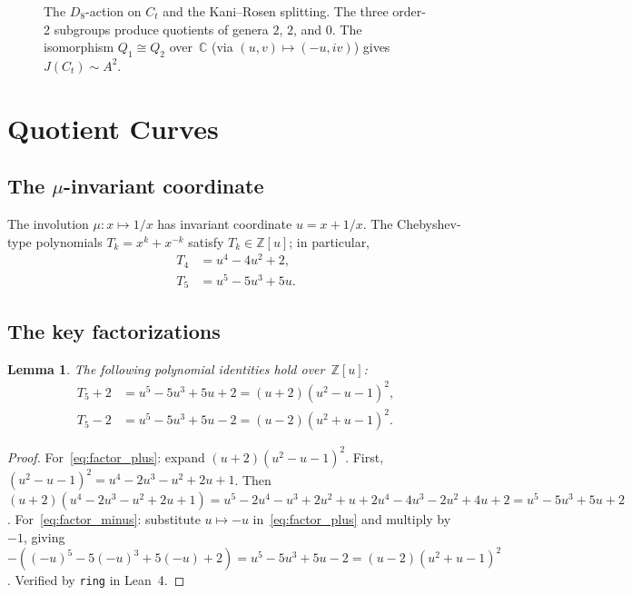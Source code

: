 \documentclass[11pt]{article}
\theoremstyle{plain}
\newtheorem{lemma}[theorem]{Lemma}
\theoremstyle{definition}
\theoremstyle{remark}
\newcommand{\Z}{\mathbb{Z}}
\newcommand{\C}{\mathbb{C}}
\begin{document}
\begin{figure}[ht]
\caption{The $D_8$-action on $C_t$ and the Kani--Rosen splitting.
The three order-2 subgroups produce quotients of genera $2$, $2$, and
$0$.  The isomorphism $Q_1 \cong Q_2$ over~$\C$ (via $(u,v) \mapsto
(-u,iv)$) gives $J(C_t) \sim A^2$.}
\label{fig:D8}
\end{figure}

\section{Quotient Curves}
\label{sec:quotient}

\subsection{The $\mu$-invariant coordinate}

The involution $\mu\colon x \mapsto 1/x$ has invariant coordinate
$u = x + 1/x$.  The Chebyshev-type polynomials $T_k = x^k + x^{-k}$
satisfy $T_k \in \Z[u]$; in particular,
\begin{align*}
  T_4 &= u^4 - 4u^2 + 2, \\
  T_5 &= u^5 - 5u^3 + 5u.
\end{align*}

\subsection{The key factorizations}

\begin{lemma}\label{lem:factor}
The following polynomial identities hold over~$\Z[u]$:
\begin{align}
  T_5 + 2 &= u^5 - 5u^3 + 5u + 2 = (u+2)(u^2 - u - 1)^2,
    \label{eq:factor_plus} \\
  T_5 - 2 &= u^5 - 5u^3 + 5u - 2 = (u-2)(u^2 + u - 1)^2.
    \label{eq:factor_minus}
\end{align}
\end{lemma}

\begin{proof}
For~\eqref{eq:factor_plus}: expand $(u+2)(u^2 - u - 1)^2$.
First, $(u^2-u-1)^2 = u^4 - 2u^3 - u^2 + 2u + 1$.
Then $(u+2)(u^4 - 2u^3 - u^2 + 2u + 1)
= u^5 - 2u^4 - u^3 + 2u^2 + u + 2u^4 - 4u^3 - 2u^2 + 4u + 2
= u^5 - 5u^3 + 5u + 2$.
For~\eqref{eq:factor_minus}: substitute $u \mapsto -u$
in~\eqref{eq:factor_plus} and multiply by $-1$, giving
$-((-u)^5 - 5(-u)^3 + 5(-u) + 2) = u^5 - 5u^3 + 5u - 2
= (u-2)(u^2+u-1)^2$.
Verified by \texttt{ring} in Lean~4.
\end{proof}
\end{document}

